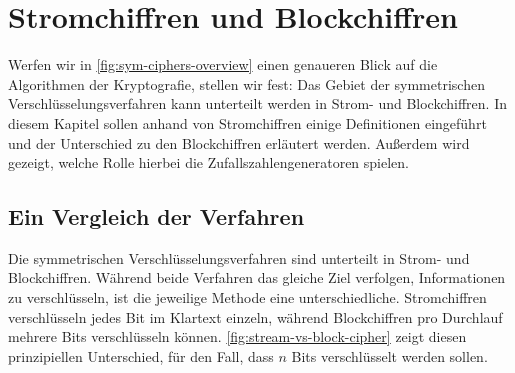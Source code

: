 \chapter{Stromchiffren und Blockchiffren}



\noindent
Werfen wir in \autoref{fig:sym-ciphers-overview} einen genaueren Blick auf die Algorithmen
der Kryptografie, stellen wir fest: Das Gebiet
der symmetrischen Verschlüsselungsverfahren kann unterteilt werden in Strom- und Blockchiffren.
In diesem Kapitel sollen anhand von Stromchiffren einige Definitionen eingeführt
und der Unterschied zu den Blockchiffren erläutert werden.
Außerdem wird gezeigt, welche Rolle hierbei die Zufallszahlengeneratoren spielen.

\section{Ein Vergleich der Verfahren}
Die symmetrischen Verschlüsselungsverfahren sind unterteilt in Strom- und Blockchiffren.
Während beide Verfahren das gleiche Ziel verfolgen, Informationen zu verschlüsseln,
ist die jeweilige
Methode eine unterschiedliche. Stromchiffren verschlüsseln jedes Bit im Klartext einzeln,
während Blockchiffren pro Durchlauf mehrere Bits verschlüsseln können.
\autoref{fig:stream-vs-block-cipher} zeigt diesen prinzipiellen Unterschied, für den Fall, dass
$n$ Bits verschlüsselt werden sollen.



